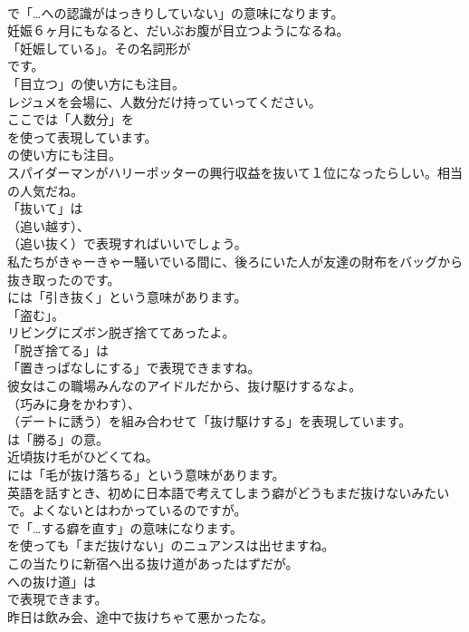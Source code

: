 \documentclass[8pt]{extreport}
\begin{document}
\begin{CJK}{UTF8}{min}
\\	で「…への認識がはっきりしていない」の意味になります。	
\\	妊娠６ヶ月にもなると、だいぶお腹が目立つようになるね。 
\\	「妊娠している」。その名詞形が
\\	です。
\\	「目立つ」の使い方にも注目。	
\\	レジュメを会場に、人数分だけ持っていってください。 
\\	ここでは「人数分」を 
\\	を使って表現しています。
\\	の使い方にも注目。	
\\	スパイダーマンがハリーポッターの興行収益を抜いて１位になったらしい。相当の人気だね。 
\\	「抜いて」は 
\\	（追い越す）、
\\	（追い抜く）で表現すればいいでしょう。	
\\	私たちがきゃーきゃー騒いでいる間に、後ろにいた人が友達の財布をバッグから抜き取ったのです。 
\\	には「引き抜く」という意味があります。
\\	「盗む」。	
\\	リビングにズボン脱ぎ捨ててあったよ。 
\\	「脱ぎ捨てる」は
\\	「置きっぱなしにする」で表現できますね。	
\\	彼女はこの職場みんなのアイドルだから、抜け駆けするなよ。 
\\	（巧みに身をかわす）、
\\	（デートに誘う）を組み合わせて「抜け駆けする」を表現しています。
\\	は「勝る」の意。	
\\	近頃抜け毛がひどくてね。 
\\	には「毛が抜け落ちる」という意味があります。	
\\	英語を話すとき、初めに日本語で考えてしまう癖がどうもまだ抜けないみたいで。よくないとはわかっているのですが。 
\\	で「…する癖を直す」の意味になります。
\\	を使っても「まだ抜けない」のニュアンスは出せますね。	
\\	この当たりに新宿へ出る抜け道があったはずだが。 
\\	への抜け道」は
\\	で表現できます。	
\\	昨日は飲み会、途中で抜けちゃて悪かったな。 

\end{CJK}
\end{document}
